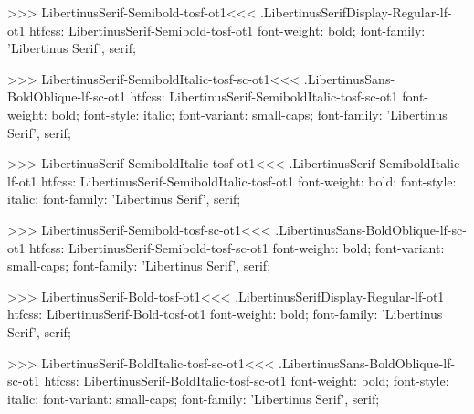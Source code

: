 {{{{>>>
\<LibertinusSerif-Semibold-tosf-ot1\><<<
.LibertinusSerifDisplay-Regular-lf-ot1
htfcss:  LibertinusSerif-Semibold-tosf-ot1  font-weight: bold; font-family: 'Libertinus Serif', serif;

>>>
\<LibertinusSerif-SemiboldItalic-tosf-sc-ot1\><<<
.LibertinusSans-BoldOblique-lf-sc-ot1
htfcss:  LibertinusSerif-SemiboldItalic-tosf-sc-ot1  font-weight: bold; font-style: italic; font-variant: small-caps; font-family: 'Libertinus Serif', serif;

>>>
\<LibertinusSerif-SemiboldItalic-tosf-ot1\><<<
.LibertinusSerif-SemiboldItalic-lf-ot1
htfcss:  LibertinusSerif-SemiboldItalic-tosf-ot1  font-weight: bold; font-style: italic; font-family: 'Libertinus Serif', serif;

>>>
\<LibertinusSerif-Semibold-tosf-sc-ot1\><<<
.LibertinusSans-BoldOblique-lf-sc-ot1
htfcss:  LibertinusSerif-Semibold-tosf-sc-ot1  font-weight: bold; font-variant: small-caps; font-family: 'Libertinus Serif', serif;

>>>
\<LibertinusSerif-Bold-tosf-ot1\><<<
.LibertinusSerifDisplay-Regular-lf-ot1
htfcss:  LibertinusSerif-Bold-tosf-ot1  font-weight: bold; font-family: 'Libertinus Serif', serif;

>>>
\<LibertinusSerif-BoldItalic-tosf-sc-ot1\><<<
.LibertinusSans-BoldOblique-lf-sc-ot1
htfcss:  LibertinusSerif-BoldItalic-tosf-sc-ot1  font-weight: bold; font-style: italic; font-variant: small-caps; font-family: 'Libertinus Serif', serif;

}}}}
